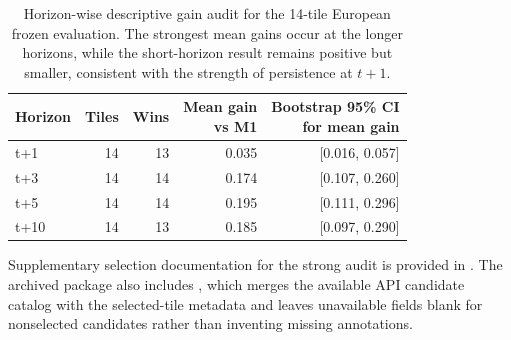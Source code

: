 \documentclass[lettersize,journal]{IEEEtran}
\begin{document}
\begin{table}[!t]
\centering
\scriptsize
\begin{adjustbox}{max width=\textwidth}
\begin{tabular}{lrrrr}
\toprule
Horizon & Tiles & Wins & \shortstack{Mean gain\\vs M1} & \shortstack{Bootstrap 95\% CI\\for mean gain} \\
\midrule
t+1 & 14 & 13 & 0.035 & [0.016, 0.057] \\
t+3 & 14 & 14 & 0.174 & [0.107, 0.260] \\
t+5 & 14 & 14 & 0.195 & [0.111, 0.296] \\
t+10 & 14 & 13 & 0.185 & [0.097, 0.290] \\
\bottomrule
\end{tabular}
\end{adjustbox}
\caption{Horizon-wise descriptive gain audit for the 14-tile European frozen evaluation. The strongest mean gains occur at the longer horizons, while the short-horizon result remains positive but smaller, consistent with the strength of persistence at $t{+}1$.}
\label{tab:e7_horizon_gain_audit}
\end{table}

Supplementary selection documentation for the strong audit is provided in . The archived package also includes , which merges the available API candidate catalog with the selected-tile metadata and leaves unavailable fields blank for nonselected candidates rather than inventing missing annotations.
\end{document}
